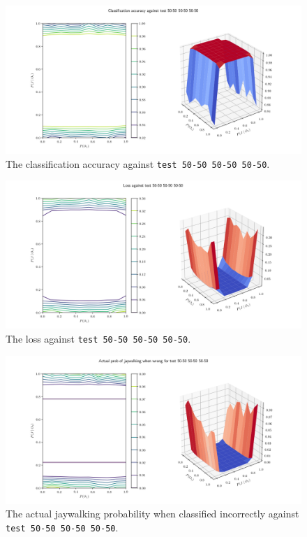 \documentclass{report}
\newcommand{\code}{\texttt}
\begin{document}
% 
% 

\begin{figure}[h]
    \centering
    \centerline{\includegraphics[scale=0.55]{test_50-50_50-50_50-50_accuracy.png}}
    \caption[]{The classification accuracy against \code{test 50-50 50-50 50-50}.}
    \label{fig:test_50-50_50-50_50-50_accuracy_plot}
\end{figure}

\begin{figure}[h]
    \centering
    \centerline{\includegraphics[scale=0.55]{test_50-50_50-50_50-50_loss.png}}
    \caption[]{The loss against \code{test 50-50 50-50 50-50}.}
    \label{fig:test_50-50_50-50_50-50_loss_plot}
\end{figure}

\begin{figure}[h]
    \centering
    \centerline{\includegraphics[scale=0.55]{test_50-50_50-50_50-50_jay_prob.png}}
    \caption[]{The actual jaywalking probability when classified incorrectly against \code{test 50-50 50-50 50-50}.}
    \label{fig:test_50-50_50-50_50-50_jay_prob_plot}
\end{figure}
\end{document}
